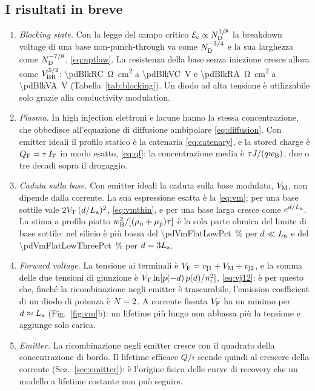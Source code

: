 \documentclass[10pt,a4paper]{scrartcl}
\let\newcommand\pdvaluedefine
\newcommand{\IF}{I_\mathrm{F}}
\newcommand{\VF}{V_\mathrm{F}}
\newcommand{\vjo}{v_\mathrm{j1}}
\newcommand{\vjt}{v_\mathrm{j2}}
\newcommand{\VT}{V_\mathrm{T}}
\newcommand{\Nem}{N}                          %
\newcommand{\Ec}{\mathcal{E}_\mathrm{c}}      %
\newcommand{\ND}{N_\mathrm{D}}
\newcommand{\nint}{n_\mathrm{i}}
\newcommand{\wB}{w_\mathrm{B}}
\newcommand{\La}{L_\mathrm{a}}
\newcommand{\mun}{\mu_\mathrm{n}}
\newcommand{\mup}{\mu_\mathrm{p}}
\newcommand{\VM}{V_\mathrm{M}}
\newcommand{\Vbr}{V_\mathrm{BR}}
\newcommand{\QF}{Q_\mathrm{F}}
\begin{document}
\subsection*{I risultati in breve}
\begin{enumerate}
\item \emph{Blocking state.} Con la legge del campo critico $\Ec \propto \ND^{1/8}$ la breakdown voltage di una base non-punch-through va come $\ND^{-3/4}$ e la sua larghezza come $\ND^{-7/8}$, \eqref{eq:nptlaw}. La resistenza della base senza iniezione cresce allora come $\Vbr^{5/2}$: \SI{\pdBlkRC}{\ohm\centi\metre\squared} a \SI{\pdBlkVC}{\volt} e \SI{\pdBlkRA}{\ohm\centi\metre\squared} a \SI{\pdBlkVA}{\volt} (Tabella~\ref{tab:blocking}). Un diodo ad alta tensione è utilizzabile solo grazie alla conductivity modulation.
\item \emph{Plasma.} In high injection elettroni e lacune hanno la stessa concentrazione, che obbedisce all'equazione di diffusione ambipolare \eqref{eq:diffusion}. Con emitter ideali il profilo statico è la catenaria \eqref{eq:catenary}, e la stored charge è $\QF = \tau\,\IF$ in modo esatto, \eqref{eq:qf}: la concentrazione media è $\tau J/(q\wB)$, due o tre decadi sopra il drogaggio.
\item \emph{Caduta sulla base.} Con emitter ideali la caduta sulla base modulata, $\VM$, non dipende dalla corrente. La sua espressione esatta è la \eqref{eq:vm}; per una base sottile vale $2\VT\,(d/\La)^2$, \eqref{eq:vmthin}, e per una base larga cresce come $e^{d/\La}$. La stima a profilo piatto $\wB^2/[(\mun+\mup)\tau]$ è la sola parte ohmica del limite di base sottile: nel silicio è più bassa del \SI{\pdVmFlatLowPct}{\percent} per $d \ll \La$ e del \SI{\pdVmFlatLowThreePct}{\percent} per $d = 3\La$.
\item \emph{Forward voltage.} La tensione ai terminali è $\VF = \vjo + \VM + \vjt$, e la somma delle due tensioni di giunzione è $\VT\ln[p(-d)\,p(d)/\nint^2]$, \eqref{eq:vj12}: è per questo che, finché la ricombinazione negli emitter è trascurabile, l'emission coefficient di un diodo di potenza è $\Nem = 2$. A corrente fissata $\VF$ ha un minimo per $d \approx \La$ (Fig.~\ref{fig:vm}b): un lifetime più lungo non abbassa più la tensione e aggiunge solo carica.
\item \emph{Emitter.} La ricombinazione negli emitter cresce con il quadrato della concentrazione di bordo. Il lifetime efficace $Q/i$ scende quindi al crescere della corrente (Sez.~\ref{sec:emitter}): è l'origine fisica delle curve di recovery che un modello a lifetime costante non può seguire.

\end{enumerate}
\end{document}
